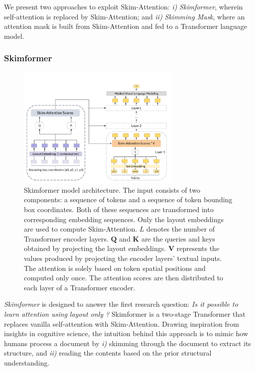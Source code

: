 We present two approaches to exploit Skim-Attention:
\emph{i)} \textit{Skimformer}, wherein self-attention is replaced by Skim-Attention; and \emph{ii)} \textit{Skimming Mask}, where an attention mask is built from Skim-Attention and fed to a Transformer language model.

\subsubsection{Skimformer}

\begin{figure}
    \centering
    \includegraphics[width=0.7\textwidth]{images/chapter3/skimformer-architecture.pdf}
    \caption{Skimformer model architecture. The input consists of two components: a sequence of tokens and a sequence of token bounding box coordinates. Both of these sequences are transformed into corresponding embedding sequences. Only the layout embeddings are used to compute Skim-Attention. $L$ denotes the number of Transformer encoder layers. $\bm{Q}$ and $\bm{K}$ are the queries and keys obtained by projecting the layout embeddings. $\bm{V}$ represents the values produced by projecting the encoder layers' textual inputs. The attention is solely based on token spatial positions and computed only once. The attention scores are then distributed to each layer of a Transformer encoder.}
    \label{fig:chapter3-skimformer-architecture}
\end{figure}

\emph{Skimformer} is designed to answer the first research question: \textit{Is it possible to learn attention using layout only ?} Skimformer is a two-stage Transformer that replaces vanilla self-attention with Skim-Attention. Drawing inspiration from insights in cognitive science, the intuition behind this approach is to mimic how humans process a document by \emph{i)} skimming through the document to extract its structure, and \emph{ii)}  reading the contents based on the prior structural understanding. 

